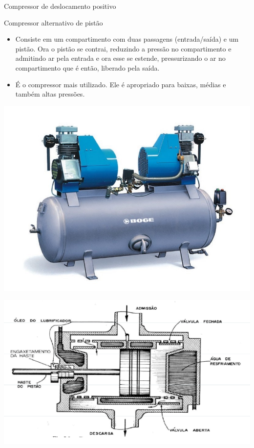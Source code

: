 \begin{frame}{Compressor de deslocamento positivo}
	\begin{block}{Compressor alternativo de pistão}
		\begin{itemize}
			\item Consiste em um compartimento com duas passagens (entrada/saída) e um pistão. Ora o pistão se contrai, reduzindo a pressão no compartimento e admitindo ar pela entrada e ora esse se estende, pressurizando o ar no compartimento que é então, liberado pela saída.
			\item É o compressor mais utilizado. Ele é apropriado para baixas, médias e também altas pressões.
		\end{itemize}
	\end{block}
	
	
	\begin{minipage}{0.45\linewidth}
		\centering
		\includegraphics[width=1\linewidth]{Figuras/Ch12/fig4}
	\end{minipage}
	\hfill
	\begin{minipage}{0.45\linewidth}
		\centering
		\includegraphics[width=1\linewidth]{Figuras/Ch12/fig5}
	\end{minipage}
\end{frame}


